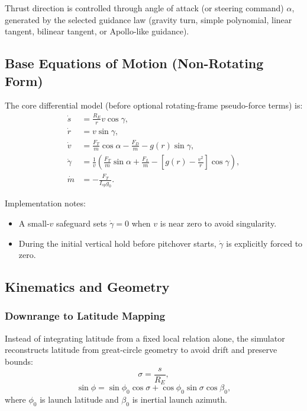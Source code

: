 Thrust direction is controlled through angle of attack (or steering command) $\alpha$, generated by the selected guidance law (gravity turn, simple polynomial, linear tangent, bilinear tangent, or Apollo-like guidance).

\subsection{Base Equations of Motion (Non-Rotating Form)}

The core differential model (before optional rotating-frame pseudo-force terms) is:
\begin{align}
 \dot{s} &= \frac{R_E}{r} v\cos\gamma, \\
 \dot{r} &= v\sin\gamma, \\
 \dot{v} &= \frac{F_T}{m}\cos\alpha - \frac{F_D}{m} - g(r)\sin\gamma, \\
 \dot{\gamma} &= \frac{1}{v}\left(\frac{F_T}{m}\sin\alpha + \frac{F_L}{m} - \left[g(r)-\frac{v^2}{r}\right]\cos\gamma\right), \\
 \dot{m} &= -\frac{F_T}{I_{sp} g_0}.
\end{align}

Implementation notes:
\begin{itemize}
\item A small-$v$ safeguard sets $\dot{\gamma}=0$ when $v$ is near zero to avoid singularity.
\item During the initial vertical hold before pitchover starts, $\dot{\gamma}$ is explicitly forced to zero.
\end{itemize}

\subsection{Kinematics and Geometry}

\subsubsection{Downrange to Latitude Mapping}

Instead of integrating latitude from a fixed local relation alone, the simulator reconstructs latitude from great-circle geometry to avoid drift and preserve bounds:
\begin{equation}
 \sigma = \frac{s}{R_E},
\end{equation}
\begin{equation}
 \sin\phi = \sin\phi_0\cos\sigma + \cos\phi_0\sin\sigma\cos\beta_0,
\end{equation}
where $\phi_0$ is launch latitude and $\beta_0$ is inertial launch azimuth.

